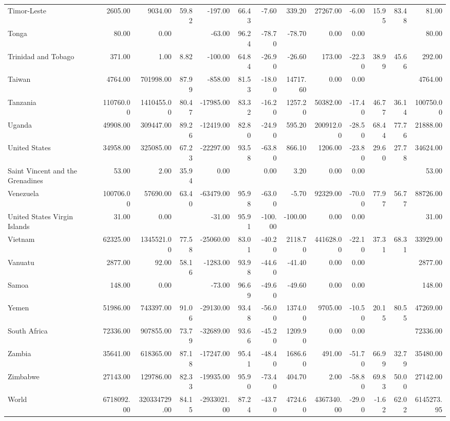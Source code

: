 \begin{table}[ht]
\begin{tabular}{lrrrrrrrrrrrr}
  Timor-Leste & 2605.00 & 9034.00 & 59.82 & -197.00 & 66.43 & -7.60 & 339.20 & 27267.00 & -6.00 & 15.95 & 83.48 & 81.00 \\ 
  Tonga & 80.00 & 0.00 &  & -63.00 & 96.24 & -78.70 & -78.70 & 0.00 & 0.00 &  &  & 80.00 \\ 
  Trinidad and Tobago & 371.00 & 1.00 & 8.82 & -100.00 & 64.84 & -26.90 & -26.60 & 173.00 & -22.30 & 38.99 & 45.66 & 292.00 \\ 
  Taiwan & 4764.00 & 701998.00 & 87.99 & -858.00 & 81.53 & -18.00 & 14717.60 & 0.00 & 0.00 &  &  & 4764.00 \\ 
  Tanzania & 110760.00 & 1410455.00 & 80.47 & -17985.00 & 83.32 & -16.20 & 1257.20 & 50382.00 & -17.40 & 46.77 & 36.14 & 100750.00 \\ 
  Uganda & 49908.00 & 309447.00 & 89.26 & -12419.00 & 82.80 & -24.90 & 595.20 & 200912.00 & -28.50 & 68.44 & 77.76 & 21888.00 \\ 
  United States & 34958.00 & 325085.00 & 67.23 & -22297.00 & 93.58 & -63.80 & 866.10 & 1206.00 & -23.80 & 29.60 & 27.78 & 34624.00 \\ 
  Saint Vincent and the Grenadines & 53.00 & 2.00 & 35.94 & 0.00 &  & 0.00 & 3.20 & 0.00 & 0.00 &  &  & 53.00 \\ 
  Venezuela & 100706.00 & 57690.00 & 63.40 & -63479.00 & 95.98 & -63.00 & -5.70 & 92329.00 & -70.00 & 77.97 & 56.77 & 88726.00 \\ 
  United States Virgin Islands & 31.00 & 0.00 &  & -31.00 & 95.91 & -100.00 & -100.00 & 0.00 & 0.00 &  &  & 31.00 \\ 
  Vietnam & 62325.00 & 1345521.00 & 77.58 & -25060.00 & 83.01 & -40.20 & 2118.70 & 441628.00 & -22.10 & 37.31 & 68.31 & 33929.00 \\ 
  Vanuatu & 2877.00 & 92.00 & 58.16 & -1283.00 & 93.98 & -44.60 & -41.40 & 0.00 & 0.00 &  &  & 2877.00 \\ 
  Samoa & 148.00 & 0.00 &  & -73.00 & 96.69 & -49.60 & -49.60 & 0.00 & 0.00 &  &  & 148.00 \\ 
  Yemen & 51986.00 & 743397.00 & 91.06 & -29130.00 & 93.48 & -56.00 & 1374.00 & 9705.00 & -10.50 & 20.15 & 80.55 & 47269.00 \\ 
  South Africa & 72336.00 & 907855.00 & 73.79 & -32689.00 & 93.66 & -45.20 & 1209.90 & 0.00 & 0.00 &  &  & 72336.00 \\ 
  Zambia & 35641.00 & 618365.00 & 87.18 & -17247.00 & 95.41 & -48.40 & 1686.60 & 491.00 & -51.70 & 66.99 & 32.79 & 35480.00 \\ 
  Zimbabwe & 27143.00 & 129786.00 & 82.33 & -19935.00 & 95.90 & -73.40 & 404.70 & 2.00 & -58.80 & 69.83 & 50.00 & 27142.00 \\ 
  World & 6718092.00 & 320334729.00 & 84.15 & -2933021.00 & 87.24 & -43.70 & 4724.60 & 4367340.00 & -29.00 & -1.62 & 62.02 & 6145273.95 \\ 
   \hline
\end{tabular}
\end{table}
